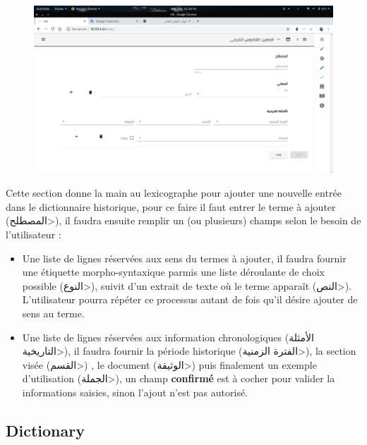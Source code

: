 \documentclass[]{report}
\begin{document}
			\paragraph{}
			\begin{figure}[H]
				\centering
				\includegraphics[width=0.8\linewidth]{images/app/addentry.png}
			\end{figure}
			Cette section donne la main au lexicographe pour ajouter une nouvelle entrée dans le dictionnaire historique, pour ce faire il faut entrer le terme à ajouter (\<المصطلح>), il faudra ensuite remplir un (ou plusieurs) champs selon le besoin
			de l'utilisateur : 
			\begin{itemize}
				\item Une liste de lignes réservées aux sens du termes à ajouter, il faudra fournir une étiquette morpho-syntaxique parmis une liste déroulante de choix possible (\<النوع>), suivit d'un extrait de texte où le terme apparaît (\<النص>).
				L'utilisateur pourra répéter ce processus autant de fois qu'il désire ajouter de sens au terme.
				
				\item Une liste de lignes réservées aux information chronologiques (\<الأمثلة التاريخية>), il faudra fournir la période historique (\<الفترة الزمنية>), la section visée (\<القسم>) , le document (\<الوثيقة>) puis finalement
				un exemple d'utilisation (\<الجملة>), un champ \textbf{confirmé} est à cocher pour valider la informations saisies, sinon l'ajout n'est pas autorisé.
			\end{itemize}
		\subsection{Dictionary}
\end{document}
